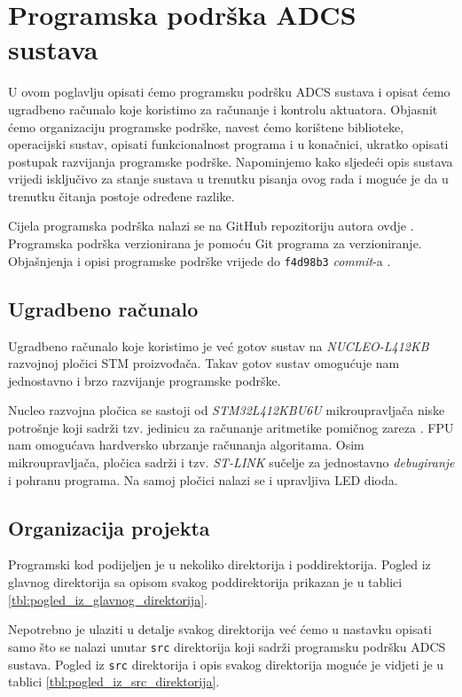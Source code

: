 \documentclass[times, utf8, diplomski, numeric]{templates/template}
\begin{document}
\chapter{Programska podrška ADCS sustava}{
    U ovom poglavlju opisati ćemo programsku podršku ADCS sustava i opisat ćemo ugradbeno računalo koje koristimo za računanje i kontrolu aktuatora. Objasnit ćemo organizaciju programske podrške, navest ćemo korištene biblioteke, operacijski sustav, opisati funkcionalnost programa i u konačnici, ukratko opisati postupak razvijanja programske podrške. Napominjemo kako sljedeći opis sustava vrijedi isključivo za stanje sustava u trenutku pisanja ovog rada i moguće je da u trenutku čitanja postoje određene razlike. 

    Cijela programska podrška nalazi se na GitHub repozitoriju autora ovdje \cite{github_repo}. Programska podrška verzionirana je pomoću Git \cite{git} programa za verzioniranje. Objašnjenja i opisi programske podrške vrijede do \texttt{f4d98b3} \emph{commit}-a \cite{git_commit}.

    \section{Ugradbeno računalo}{
        Ugradbeno računalo koje koristimo je već gotov sustav na \emph{NUCLEO-L412KB} razvojnoj pločici \cite{nucleo_um} STM proizvođača. Takav gotov sustav omogućuje nam jednostavno i brzo razvijanje programske podrške. 

        Nucleo razvojna pločica se sastoji od \emph{STM32L412KBU6U} mikroupravljača niske potrošnje \cite{uc_um} koji sadrži tzv. jedinicu za računanje aritmetike pomičnog zareza . FPU nam omogućava hardversko ubrzanje računanja algoritama. Osim mikroupravljača, pločica sadrži i tzv. \emph{ST-LINK} sučelje za jednostavno \emph{debugiranje} i pohranu programa. Na samoj pločici nalazi se i upravljiva LED dioda.
    }

    \section{Organizacija projekta}{
        Programski kod podijeljen je u nekoliko direktorija i poddirektorija. Pogled iz glavnog direktorija sa opisom svakog poddirektorija prikazan je u tablici \ref{tbl:pogled_iz_glavnog_direktorija}.

        Nepotrebno je ulaziti u detalje svakog direktorija već ćemo u nastavku opisati samo što se nalazi unutar \texttt{src} direktorija koji sadrži programsku podršku ADCS sustava. Pogled iz \texttt{src} direktorija i opis svakog direktorija moguće je vidjeti je u tablici \ref{tbl:pogled_iz_src_direktorija}.

}}
\end{document}
